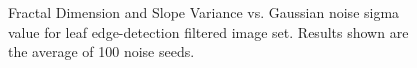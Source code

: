 \documentclass[12pt, oneside]{book}
\begin{document}
\begin{figure}[!b]
  \centering
  \caption[Fractal Dimension and Slope Variance vs. Gaussian noise sigma value for leaf edge-detection filtered image set.]{Fractal Dimension and Slope Variance vs. Gaussian noise sigma value for leaf edge-detection filtered image set.  Results shown are the average of 100 noise seeds.}
  \label{fig:fallleaf_gaussian_multi_result}
\end{figure}
\end{document}
